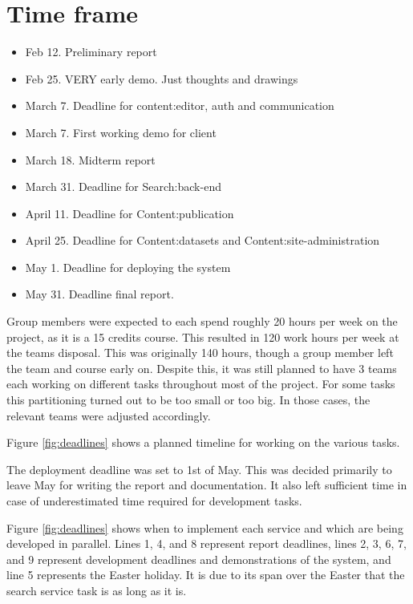 \section{Time frame}

\if  %
\begin{itemize}
    \item Feb 12. Preliminary report
    \item Feb 25. VERY early demo. Just thoughts and drawings
    \item March 7. Deadline for content:editor, auth and communication
    \item March 7. First working demo for client
    \item March 18. Midterm report
    \item March 31. Deadline for Search:back-end
    \item April 11. Deadline for Content:publication
    \item April 25. Deadline for Content:datasets and Content:site-administration
    \item May 1. Deadline for deploying the system
    \item May 31. Deadline final report. 
\end{itemize}
\fi   %
Group members were expected to each spend roughly 20 hours per week on the project, as it is a 15 credits course.
This resulted in 120 work hours per week at the teams disposal. This was originally 140 hours, though a group member left the team and course early on. Despite this, it was still planned to have 3 teams each working on different tasks throughout most of the project. For some tasks this partitioning turned out to be too small or too big. In those cases, the relevant teams were adjusted accordingly. 

Figure \ref{fig:deadlines} shows a planned timeline for working on the various tasks. 

The deployment deadline was set to 1st of May. This was decided primarily to leave May for writing the report and documentation. It also left sufficient time in case of underestimated time required for development tasks.

Figure \ref{fig:deadlines} shows when to implement each service and which are being developed in parallel. Lines 1, 4, and 8 represent report deadlines, lines 2, 3, 6, 7, and 9 represent development deadlines and demonstrations of the system, and line 5 represents the Easter holiday. It is due to its span over the Easter that the search service task is as long as it is.

